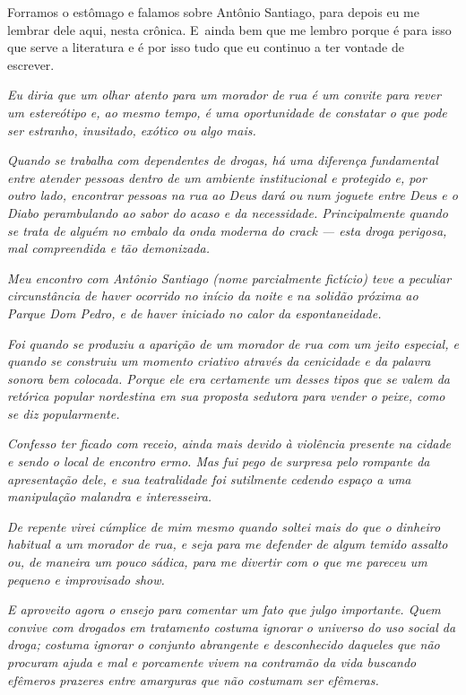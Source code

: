 Forramos o estômago e falamos sobre Antônio Santiago, para depois eu me
lembrar dele aqui, nesta crônica. E~ainda bem que me lembro porque é
para isso que serve a literatura e é por isso tudo que eu continuo a ter
vontade de escrever.~

\begin{center}\asterisc{}\end{center}
\begingroup\small

\emph{Eu diria que um olhar atento para um morador de rua é um convite
para rever um estereótipo e, ao mesmo tempo, é uma oportunidade de
constatar o que pode ser estranho, inusitado, exótico ou algo mais.}~

\emph{Quando se trabalha com dependentes de drogas, há uma diferença
fundamental entre atender pessoas dentro de um ambiente institucional e
protegido e, por outro lado, encontrar pessoas na rua ao Deus dará ou
num joguete entre Deus e o Diabo perambulando ao sabor do acaso e da
necessidade. Principalmente quando se trata de alguém no embalo da onda
moderna do crack --- esta droga perigosa, mal compreendida e tão
demonizada.}~

\emph{Meu encontro com Antônio Santiago (nome parcialmente fictício)
teve a peculiar circunstância de haver ocorrido no início da noite e na
solidão próxima ao Parque Dom Pedro, e de haver iniciado no calor da
espontaneidade.}~

\emph{Foi quando se produziu a aparição de um morador de rua com um
jeito especial, e quando se construiu um momento criativo através da
cenicidade e da palavra sonora bem colocada. Porque ele era certamente
um desses tipos que se valem da retórica popular nordestina em sua
proposta sedutora para vender o peixe, como se diz popularmente.}~

\emph{Confesso ter ficado com receio, ainda mais devido à violência
presente na cidade e sendo o local de encontro ermo. Mas fui pego de
surpresa pelo rompante da apresentação dele, e sua teatralidade foi
sutilmente cedendo espaço a uma manipulação malandra e interesseira.}~

\emph{De repente virei cúmplice de mim mesmo quando soltei mais do que o
dinheiro habitual a um morador de rua, e seja para me defender de algum
temido assalto ou, de maneira um pouco sádica, para me divertir com o
que me pareceu um pequeno e improvisado show.}~

\emph{E aproveito agora o ensejo para comentar um fato que julgo
importante. Quem convive com drogados em tratamento costuma ignorar o
universo do uso social da droga; costuma ignorar o conjunto abrangente e
desconhecido daqueles que não procuram ajuda e mal e porcamente vivem na
contramão da vida buscando efêmeros prazeres entre amarguras que não
costumam ser efêmeras.}~

